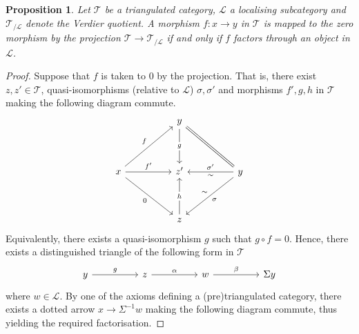\documentclass[oneside,11pt]{amsart}
\newtheorem{prop}[thm]{Proposition}
\theoremstyle{definition}
\theoremstyle{remark}
\begin{document}
\begin{prop}\label{proptri}
 Let $\mathscr{T} $ be a triangulated category, $\mathscr{L} $ a localising subcategory and $\mathscr{T}_{/\mathscr{L} }$ denote the Verdier quotient. A morphism $f:x \rightarrow y $ in $\mathscr{T} $ is mapped to the zero morphism by the projection $\mathscr{T} \rightarrow \mathscr{T}_{/\mathscr{L} }  $ if and only if $f$ factors through an object in $\mathscr{L} $.
\end{prop}
\begin{proof}
 Suppose that $f$ is taken to $0$ by the projection. That is, there exist $z,z'\in \mathscr{T} $, quasi-isomorphisms (relative to $\mathscr{L} $) $\sigma ,\sigma '$ and morphisms $f',g,h$ in $\mathscr{T} $ making the following diagram commute.      
\[\begin{tikzcd}
	&& y \\
	\\
	x && {z'} && y \\
	\\
	&& z
	\arrow["g"{description}, from=1-3, to=3-3]
	\arrow["f", from=3-1, to=1-3]
	\arrow["{f'}", from=3-1, to=3-3]
	\arrow["0"', from=3-1, to=5-3]
	\arrow[equals, from=3-5, to=1-3]
	\arrow["{\sigma'}"', from=3-5, to=3-3]
	\arrow["\sim", draw=none, from=3-5, to=3-3]
	\arrow["\sigma", from=3-5, to=5-3]
	\arrow["\sim"', draw=none, from=3-5, to=5-3]
	\arrow["h"{description}, from=5-3, to=3-3]
\end{tikzcd}\]
Equivalently, there exists a quasi-isomorphism $g$ such that $g\circ f=0$. Hence, there exists a distinguished triangle of the following form in $\mathscr{T} $
\[\begin{tikzcd}
	y && z && w && {\Sigma y}
	\arrow["g", from=1-1, to=1-3]
	\arrow["\alpha", from=1-3, to=1-5]
	\arrow["\beta", from=1-5, to=1-7]
\end{tikzcd}\]
where $w\in \mathscr{L} $. By one of the axioms defining a (pre)triangulated category, there exists a dotted arrow $x \rightarrow \Sigma^{-1}w$ making the following diagram commute, thus yielding the required factorisation.

\end{proof}
\end{document}
